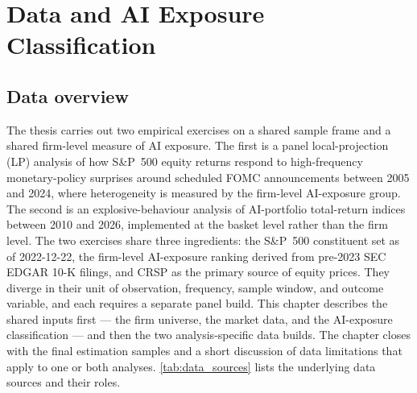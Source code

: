 %

\chapter{Data and AI Exposure Classification}
\label{ch:data}

\section{Data overview}
\label{sec:data-overview}

The thesis carries out two empirical exercises on a shared sample frame and a shared firm-level measure of AI exposure. The first is a panel local-projection (LP) analysis of how S\&P~500 equity returns respond to high-frequency monetary-policy surprises around scheduled FOMC announcements between 2005 and 2024, where heterogeneity is measured by the firm-level AI-exposure group. The second is an explosive-behaviour analysis of AI-portfolio total-return indices between 2010 and 2026, implemented at the basket level rather than the firm level. The two exercises share three ingredients: the S\&P~500 constituent set as of \mbox{2022-12-22}, the firm-level AI-exposure ranking derived from pre-2023 SEC EDGAR 10-K filings, and CRSP as the primary source of equity prices. They diverge in their unit of observation, frequency, sample window, and outcome variable, and each requires a separate panel build. This chapter describes the shared inputs first --- the firm universe, the market data, and the AI-exposure classification --- and then the two analysis-specific data builds. The chapter closes with the final estimation samples and a short discussion of data limitations that apply to one or both analyses. \cref{tab:data_sources} lists the underlying data sources and their roles.

